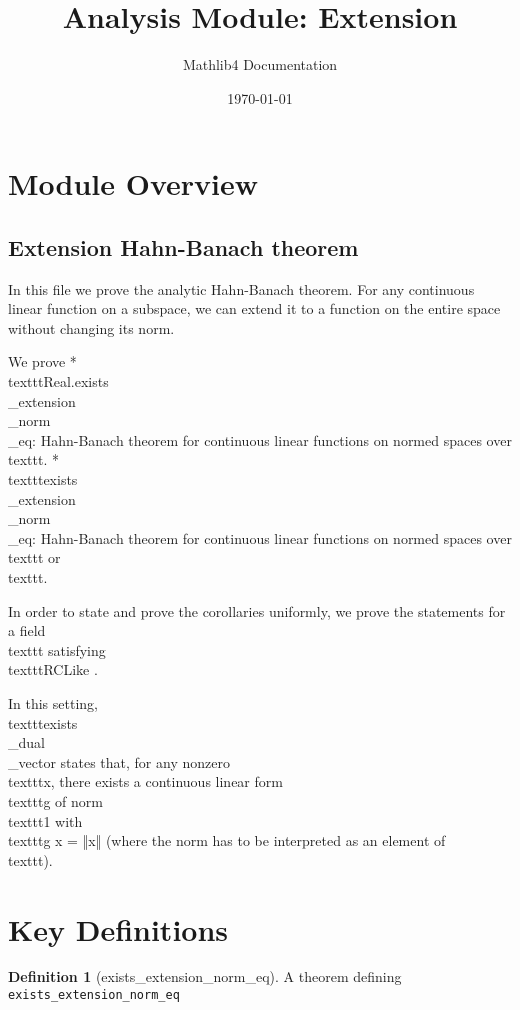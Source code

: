 \documentclass{article}
\title{Analysis Module: Extension}
\author{Mathlib4 Documentation}
\date{\today}
\theoremstyle{definition}
\newtheorem{definition}{Definition}
\begin{document}
\maketitle

\section{Module Overview}
\subsection{Extension Hahn-Banach theorem}

In this file we prove the analytic Hahn-Banach theorem. For any continuous linear function on a
subspace, we can extend it to a function on the entire space without changing its norm.

We prove
* \\texttt{Real.exists\\_extension\\_norm\\_eq}: Hahn-Banach theorem for continuous linear functions on normed
  spaces over \\texttt{}.
* \\texttt{exists\\_extension\\_norm\\_eq}: Hahn-Banach theorem for continuous linear functions on normed spaces
  over \\texttt{} or \\texttt{}.

In order to state and prove the corollaries uniformly, we prove the statements for a field \\texttt{}
satisfying \\texttt{RCLike }.

In this setting, \\texttt{exists\\_dual\\_vector} states that, for any nonzero \\texttt{x}, there exists a continuous
linear form \\texttt{g} of norm \\texttt{1} with \\texttt{g x = ‖x‖} (where the norm has to be interpreted as an element
of \\texttt{}).

\section{Key Definitions}
\begin{definition}[exists_extension_norm_eq]
A theorem defining \texttt{exists_extension_norm_eq}
\end{definition}
\end{document}
